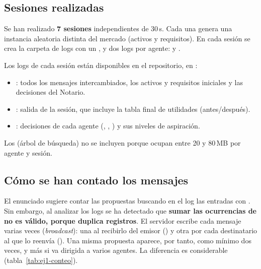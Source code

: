 \subsection*{Sesiones realizadas}

Se han realizado \textbf{7 sesiones} independientes de 30\,s. Cada una genera una instancia
aleatoria distinta del mercado (activos y requisitos). En cada sesión se crea la carpeta de logs con
un , y dos logs por agente:  y .

Los logs de cada sesión están disponibles en el repositorio, en
:

\begin{itemize}
  \item {}: todos los mensajes intercambiados, los activos y requisitos iniciales y
        las decisiones del Notario.
  \item {}: salida de la sesión, que incluye la tabla final de utilidades
        (antes/después).
  \item {}: decisiones de cada agente (, ,
        ) y sus niveles de aspiración.
\end{itemize}

Los  (árbol de búsqueda) no se incluyen porque ocupan entre 20 y 80\,MB
por agente y sesión.

\subsection{Cómo se han contado los mensajes}
\label{sec:ej1-conteo}

El enunciado sugiere contar las propuestas buscando en el log las entradas con
. Sin embargo, al analizar los logs se ha detectado que \textbf{sumar las
ocurrencias de  no es válido, porque duplica registros}. El servidor escribe cada
mensaje varias veces (\emph{broadcast}): una al recibirlo del emisor () y
otra por cada destinatario al que lo reenvía (). Una misma propuesta aparece,
por tanto, como mínimo dos veces, y más si va dirigida a varios agentes. La diferencia es
considerable (tabla~\ref{tab:ej1-conteo}).

